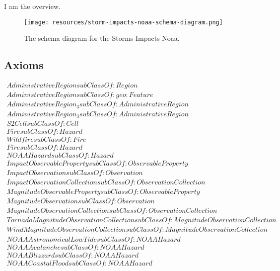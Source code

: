 I am the overview.

\begin{figure}[h!]
  \begin{center}
    \texttt{[image: resources/storm-impacts-noaa-schema-diagram.png]}
  \end{center}
  \caption{The schema diagram for the Storms Impacts Noaa.}
  \label{fig:ov-diagram}
\end{figure}


\subsection{Axioms}
\begin{align}
  AdministrativeRegion subClassOf: Region\\
  AdministrativeRegion subClassOf: geo:Feature\\
  AdministrativeRegion_3 subClassOf: AdministrativeRegion\\
  AdministrativeRegion_3 subClassOf: AdministrativeRegion\\
  S2Cell subClassOf: Cell\\
  Fire subClassOf: Hazard\\
  Wildfire subClassOf: Fire\\
  Fire subClassOf: Hazard\\
  NOAAHazard subClassOf: Hazard\\
  ImpactObservableProperty subClassOf: ObservableProperty\\
  ImpactObservation subClassOf: Observation\\
  ImpactObservationCollection subClassOf: ObservationCollection\\
  MagnitudeObservableProperty subClassOf: ObservableProperty\\
  MagnitudeObservation subClassOf: Observation\\
  MagnitudeObservationCollection subClassOf: ObservationCollection\\
  TornadoMagnitudeObservationCollection subClassOf: MagnitudeObservationCollection\\
  WindMagnitudeObservationCollection subClassOf: MagnitudeObservationCollection\\
  NOAAAstronomicalLowTide subClassOf: NOAAHazard\\
  NOAAAvalanche subClassOf: NOAAHazard\\
  NOAABlizzard subClassOf: NOAAHazard\\
  NOAACoastalFlood subClassOf: NOAAHazard\\

\end{align}
